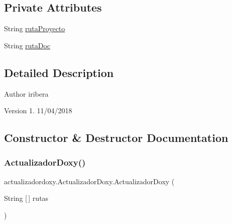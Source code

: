 \subsection*{Private Attributes}
\begin{DoxyCompactItemize}
\item 
String \mbox{\hyperlink{classactualizadordoxy_1_1_actualizador_doxy_a6e5d8e5e0fe3f2392d1c426bea2fb7fa}{ruta\+Proyecto}}
\item 
String \mbox{\hyperlink{classactualizadordoxy_1_1_actualizador_doxy_a5655cc699bfc4a0b01432170892663d8}{ruta\+Doc}}
\end{DoxyCompactItemize}


\subsection{Detailed Description}
\begin{DoxyAuthor}{Author}
iribera 
\end{DoxyAuthor}
\begin{DoxyVersion}{Version}
1. 11/04/2018 
\end{DoxyVersion}


\subsection{Constructor \& Destructor Documentation}
\mbox{\label{classactualizadordoxy_1_1_actualizador_doxy_a380363d2f93108de5f30dea17ba26946}} 
\subsubsection{\texorpdfstring{Actualizador\+Doxy()}{ActualizadorDoxy()}}
{\footnotesize\ttfamily actualizadordoxy.\+Actualizador\+Doxy.\+Actualizador\+Doxy (\begin{DoxyParamCaption}\item[{String \mbox{[}$\,$\mbox{]}}]{rutas }\end{DoxyParamCaption})\hspace{0.3cm}{\ttfamily [inline]}}


